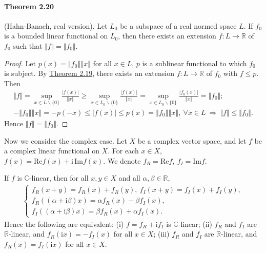 \documentclass{article}
\renewcommand{\Re}{\mathrm{Re}}
\renewcommand{\Im}{\mathrm{Im}}
\renewcommand{\i}{\mathrm{i}}
\begin{document}
\paragraph{Theorem 2.20\label{thm:2.20}} (Hahn-Banach, real version). Let $L_0$ be a subspace of a real normed space $L$. If $f_0$ is a bounded linear functional on $L_0$, then there exists an extension $f:L\to\mathbb{R}$ of $f_0$ such that $\Vert f\Vert = \Vert f_0\Vert$.
\begin{proof}
Let $p(x)=\left\Vert f_0\right\Vert\left\Vert x\right\Vert$ for all $x\in L$, $p$ is a sublinear functional to which $f_0$ is subject. By \hyperref[thm:2.19]{Theorem 2.19}, there exists an extension $f:L\to\mathbb{R}$ of $f_0$ with $f\leq p$. Then
\begin{align*}
	\Vert f\Vert = \sup_{x\in L\backslash\{0\}}\frac{\vert f(x)\vert}{\Vert x\Vert} \geq \sup_{x\in L_0\backslash\{0\}}\frac{\vert f(x)\vert}{\Vert x\Vert} = \sup_{x\in L_0\backslash\{0\}}\frac{\vert f_0(x)\vert}{\Vert x\Vert} = \Vert f_0\Vert;\\
	-\left\Vert f_0\right\Vert\left\Vert x\right\Vert = -p(-x)\leq \vert f(x)\vert \leq p(x) = \left\Vert f_0\right\Vert\left\Vert x\right\Vert,\ \forall x\in L\ \Rightarrow\ \Vert f\Vert\leq\Vert f_0\Vert.
\end{align*}
Hence $\Vert f\Vert = \Vert f_0\Vert$.
\end{proof}

Now we consider the complex case. Let $X$ be a complex vector space, and let $f$ be a complex linear functional on $X$. For each $x\in X$, $f(x)=\Re f(x) + \i\,\Im f(x)$. We denote $f_R=\Re f,\ f_I=\Im f$.
\vspace{0.1cm}

If $f$ is $\mathbb{C}$-linear, then for all $x,y\in X$ and all $\alpha,\beta\in\mathbb{R}$,
\begin{align*}
\begin{cases}
	f_R(x+y) = f_R(x) + f_R(y),\ f_I(x+y) = f_I(x) + f_I(y),\\
	f_R\left((\alpha+\i\beta)x\right) = \alpha f_R(x) - \beta f_I(x),\\
	f_I\left((\alpha+\i\beta)x\right) = \beta f_R(x) + \alpha f_I(x).
\end{cases}
\end{align*}
Hence the following are equivalent: (i) $f=f_R+\i f_I$ is $\mathbb{C}$-linear; (ii) $f_R$ and $f_I$ are $\mathbb{R}$-linear, and $f_R(\i x)=-f_I(x)$ for all $x\in X$; (iii) $f_R$ and $f_I$ are $\mathbb{R}$-linear, and $f_R(x)=f_I(\i x)$ for all $x\in X$.
\vspace{0.1cm}
\end{document}
